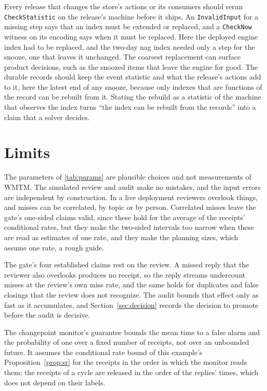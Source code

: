 \documentclass[11pt]{article}
\newcommand{\code}[1]{\texttt{#1}}
\theoremstyle{definition}
\theoremstyle{plain}
\begin{document}
Every release that changes the store's actions or its consumers should rerun \code{CheckStatistic}
on the release's machine before it ships. An \code{InvalidInput} for a missing step says that an
index must be extended or replaced, and a \code{CheckNow} witness on its encoding says when it must
be replaced. Here the deployed engine index had to be replaced, and the two-day nag index needed
only a step for the snooze, one that leaves it unchanged. The coarsest replacement can surface
product decisions, such as the snoozed items that leave the engine for good. The durable records
should keep the event statistic and what the release's actions add to it, here the latest end of any
snooze, because only indexes that are functions of the record can be rebuilt from it. Stating the
rebuild as a statistic of the machine that observes the index turns ``the index can be rebuilt from
the records'' into a claim that a solver decides.

\section{Limits}\label{sec:limits}

The parameters of \cref{tab:params} are plausible choices and not measurements of WMTM. The
simulated review and audit make no mistakes, and the input errors are independent by construction.
In a live deployment reviewers overlook things, and misses can be correlated, by topic or by
person. Correlated misses leave the gate's one-sided claims valid, since these hold for the average
of the receipts' conditional rates, but they make the two-sided intervals too narrow when these are
read as estimates of one rate, and they make the planning sizes, which assume one rate, a rough
guide.

The gate's four established claims rest on the review. A missed reply that the reviewer also
overlooks produces no receipt, so the reply streams undercount misses at the review's own miss rate,
and the same holds for duplicates and false closings that the review does not recognize. The audit
bounds that effect only as fast as it accumulates, and Section~\ref{sec:decision} records the
decision to promote before the audit is decisive.

The changepoint monitor's guarantee bounds the mean time to a false alarm and the probability of
one over a fixed number of receipts, not over an unbounded future. It assumes the conditional rate
bound of this example's Proposition~\ref{prop:sr} for the receipts in the order in which the
monitor reads them;
the receipts of a cycle are released in the order of the replies' times, which does not depend on
their labels.
\end{document}
